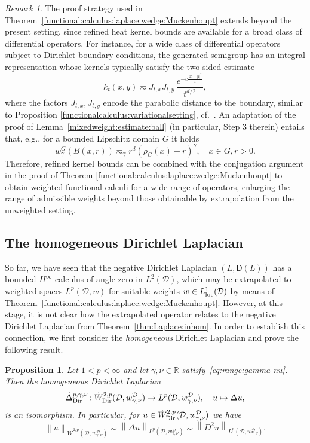 \documentclass[12pt,a4paper, reqno]{amsart}
\theoremstyle{plain}
\newtheorem{proposition}[theorem]{Proposition}
\theoremstyle{definition}
\theoremstyle{remark}
\newtheorem{remark}[theorem]{Remark}
\numberwithin{equation}{section}
\newcommand{\1}{\mathbbm{1}}
\newcommand{\R}{\ensuremath{\mathbb{R}}}
\newcommand{\calD}{\ensuremath{\mathcal{D}}}
\newcommand{\sfD}{\ensuremath{\mathsf{D}}}
\newcommand{\Dir}{\textup{Dir}}
\newcommand{\nrm}[1]{\left\lVert #1 \right\rVert}
\begin{document}
  
\begin{remark}

The proof strategy used in Theorem~\ref{functional:calculus:laplace:wedge:Muckenhoupt} extends beyond the present setting, since refined heat kernel bounds are available for a broad class of differential operators.
For instance, for a wide class of differential operators subject to Dirichlet boundary conditions, the generated semigroup has an integral representation whose
kernels typically satisfy the two-sided estimate
\[
  k_t(x,y) \eqsim J_{t,x} J_{t,y} \, \frac{e^{-c\frac{|x-y|^2}{t}}}{t^{d/2}}, 
\]
where the factors $J_{t,x},J_{t,y}$ encode the parabolic distance to the boundary, similar to Proposition \ref{functionalcalculus:variationalsetting},  cf.~\cite{Davies_1989_HeatKernels_spectral_theory,cho2006}. 
An adaptation of the proof of Lemma~\ref{mixedweight:estimate:ball} (in particular, Step 3 therein)  entails that, e.g., for a bounded Lipschitz domain $G$ it holds 
\[w_\gamma^G(B(x,r)) \eqsim_\gamma r^d(\rho_G(x)+r)^\gamma,\quad x\in G, r>0.\]
Therefore, refined kernel bounds can be combined with the conjugation argument in the proof of Theorem \ref{functional:calculus:laplace:wedge:Muckenhoupt} to obtain weighted functional calculi for a wide range of operators, enlarging the range of admissible weights beyond those
obtainable by extrapolation from the unweighted setting.
\end{remark}


\subsection{The homogeneous Dirichlet Laplacian}\label{sec:Laplace:hom}

So far, we have seen that the negative Dirichlet Laplacian $(L,\sfD(L))$ has a bounded $H^\infty$-calculus of angle zero in $L^2(\calD)$, which may be extrapolated to weighted spaces $L^p(\calD,w)$ for suitable weights $w\in L^1_\textup{loc}(\calD)$ by means of Theorem~\ref{functional:calculus:laplace:wedge:Muckenhoupt}. 
However, at this stage, it is not clear how the extrapolated operator relates to the negative Dirichlet Laplacian from Theorem~\ref{thm:Laplace:inhom}. 
In order to establish this connection, we first consider the \emph{homogeneous} Dirichlet Laplacian and prove the following result.

\begin{proposition}\label{prop:Laplace:hom}
    Let $1<p<\infty$ and let $\gamma,\nu\in\R$ satisfy~\eqref{eq:range:gamma-nu}.
Then the \emph{homogeneous Dirichlet Laplacian}
    \[
    \Dot{\Delta}_\Dir^{p,\gamma,\nu}\colon \Dot{W}^{2,p}_\Dir(\calD,w_{\gamma,\nu}^\calD)\to L^p(\calD,w_{\gamma,\nu}^\calD),\quad u\mapsto\Delta u,
    \]
    is an isomorphism. In particular, for $u\in \Dot{W}^{2,p}_\Dir(\calD,w_{\gamma,\nu}^\calD)$ we have
    \begin{equation}\label{eq:homL:normequiv}
    \nrm{u}_{\Dot{W}^{2,p}(\calD,w_{\gamma,\nu}^\calD)}
    \eqsim
    \nrm{\Delta u}_{L^p(\calD,w_{\gamma,\nu}^\calD)}
    \eqsim
    \nrm{D^2 u}_{L^p(\calD,w_{\gamma,\nu}^\calD)}.
    \end{equation}
\end{proposition}
\end{document}
